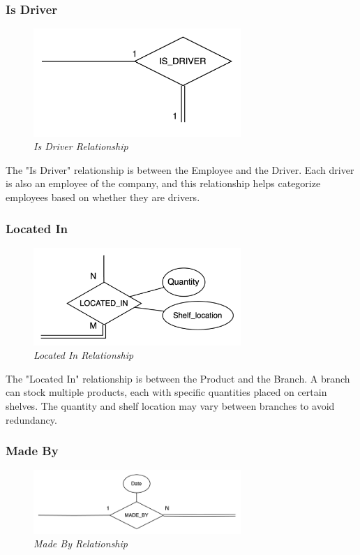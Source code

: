 \documentclass[11pt]{article}
\begin{document}
\subsubsection{Is Driver}
\begin{figure}[H]
  \centering
  \includegraphics[width=0.7\textwidth]{images/relationships/is_driver.png}
  \caption{\textit{Is Driver Relationship}}
\end{figure}

The "Is Driver" relationship is between the Employee and the Driver. Each driver is also an employee of the company, and this relationship helps categorize employees based on whether they are drivers.

\subsubsection{Located In}
\begin{figure}[H]
  \centering
  \includegraphics[width=0.7\textwidth]{images/relationships/located_in.png}
  \caption{\textit{Located In Relationship}}
\end{figure}

The "Located In" relationship is between the Product and the Branch. A branch can stock multiple products, each with specific quantities placed on certain shelves. The quantity and shelf location may vary between branches to avoid redundancy.

\subsubsection{Made By}
\begin{figure}[H]
  \centering
  \includegraphics[width=0.7\textwidth]{images/relationships/made_by.png}
  \caption{\textit{Made By Relationship}}
\end{figure}
\end{document}
